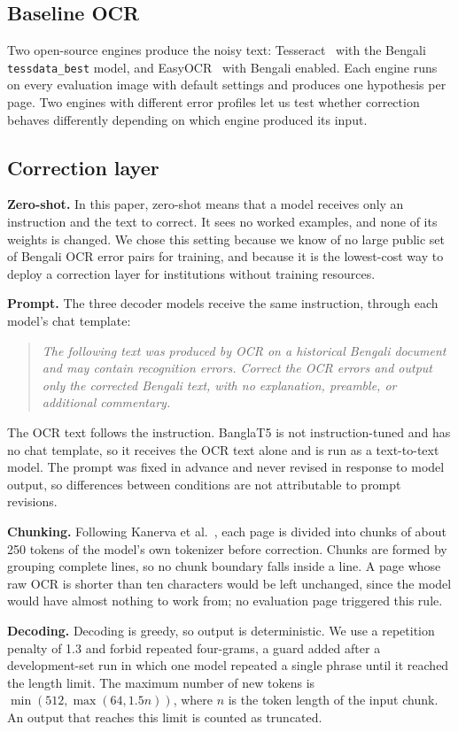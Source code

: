 \documentclass[conference]{IEEEtran}
\begin{document}
\subsection{Baseline OCR}
Two open-source engines produce the noisy text: Tesseract~\cite{smith2007tesseract} with the Bengali \texttt{tessdata\_best} model, and EasyOCR~\cite{jaidedai2024easyocr} with Bengali enabled. Each engine runs on every evaluation image with default settings and produces one hypothesis per page. Two engines with different error profiles let us test whether correction behaves differently depending on which engine produced its input.

\subsection{Correction layer}
\textbf{Zero-shot.} In this paper, zero-shot means that a model receives only an instruction and the text to correct. It sees no worked examples, and none of its weights is changed. We chose this setting because we know of no large public set of Bengali OCR error pairs for training, and because it is the lowest-cost way to deploy a correction layer for institutions without training resources.

\textbf{Prompt.} The three decoder models receive the same instruction, through each model's chat template:
\begin{quote}
\small\itshape
The following text was produced by OCR on a historical Bengali document and may contain recognition errors. Correct the OCR errors and output only the corrected Bengali text, with no explanation, preamble, or additional commentary.
\end{quote}
The OCR text follows the instruction. BanglaT5 is not instruction-tuned and has no chat template, so it receives the OCR text alone and is run as a text-to-text model. The prompt was fixed in advance and never revised in response to model output, so differences between conditions are not attributable to prompt revisions.

\textbf{Chunking.} Following Kanerva et al.~\cite{kanerva2025nofreelunches}, each page is divided into chunks of about 250 tokens of the model's own tokenizer before correction. Chunks are formed by grouping complete lines, so no chunk boundary falls inside a line. A page whose raw OCR is shorter than ten characters would be left unchanged, since the model would have almost nothing to work from; no evaluation page triggered this rule.

\textbf{Decoding.} Decoding is greedy, so output is deterministic. We use a repetition penalty of 1.3 and forbid repeated four-grams, a guard added after a development-set run in which one model repeated a single phrase until it reached the length limit. The maximum number of new tokens is $\min(512,\max(64,1.5n))$, where $n$ is the token length of the input chunk. An output that reaches this limit is counted as truncated.
\end{document}
